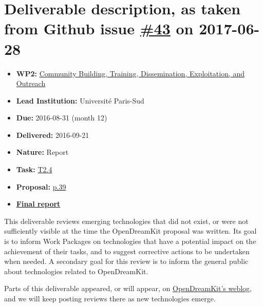 \section*{\texorpdfstring{Deliverable description, as taken from Github
issue
\href{https://github.com/OpenDreamKit/OpenDreamKit/issues/43}{\#43} on
2017-06-28}{Deliverable description, as taken from Github issue \#43 on 2017-06-28}}\label{deliverable-description-as-taken-from-github-issue-43-on-2017-06-28}

\begin{itemize}
\tightlist
\item
  \textbf{WP2:}
  \href{https://github.com/OpenDreamKit/OpenDreamKit/tree/master/WP2}{Community
  Building, Training, Dissemination, Exploitation, and Outreach}
\item
  \textbf{Lead Institution:} Université Paris-Sud
\item
  \textbf{Due:} 2016-08-31 (month 12)
\item
  \textbf{Delivered:} 2016-09-21
\item
  \textbf{Nature:} Report
\item
  \textbf{Task:}
  \href{https://github.com/OpenDreamKit/OpenDreamKit/issues/27}{T2.4}
\item
  \textbf{Proposal:}
  \href{https://github.com/OpenDreamKit/OpenDreamKit/raw/master/Proposal/proposal-www.pdf}{p.39}
\item
  \textbf{\href{https://github.com/OpenDreamKit/OpenDreamKit/raw/master/WP2/D2.3/report-final.pdf}{Final
  report}}
\end{itemize}

This deliverable reviews emerging technologies that did not exist, or
were not sufficiently visible at the time the OpenDreamKit proposal was
written. Its goal is to inform Work Packages on technologies that have a
potential impact on the achievement of their tasks, and to suggest
corrective actions to be undertaken when needed. A secondary goal for
this review is to inform the general public about technologies related
to OpenDreamKit.

Parts of this deliverable appeared, or will appear, on
\href{http://opendreamkit.org}{OpenDreamKit's weblog}, and we will keep
posting reviews there as new technologies emerge.

